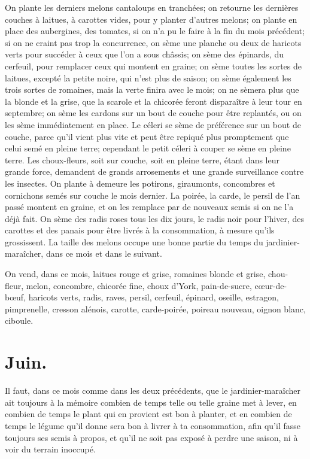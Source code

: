 \documentclass[10pt,a4paper]{book}
\begin{document}
On plante les derniers melons cantaloups en tranchées; on retourne les dernières couches à laitues, à carottes vides, pour y planter d'autres melons; on plante en place des aubergines, des tomates, si on n'a pu le faire à la fin du mois précédent; si on ne craint pas trop la concurrence, on sème une planche ou deux de haricots verts pour succéder à ceux que l'on a sous châssis; on sème des épinards, du cerfeuil, pour remplacer ceux qui montent en graine; on sème toutes les sortes de laitues, excepté la petite noire, qui n'est plus de saison; on sème également les trois sortes de romaines, mais la verte finira avec le mois; on ne sèmera plus que la blonde et la grise, que la scarole et la chicorée feront disparaître à leur tour en septembre; on sème les cardons sur un bout de couche pour être replantés, ou on les sème immédiatement en place. Le céleri se sème de préférence sur un bout de couche, parce qu'il vient plus vite et peut être repiqué plus promptement que celui semé en pleine terre; cependant le petit céleri à couper se sème en pleine terre. Les choux-fleurs, soit sur couche, soit en pleine terre, étant dans leur grande force, demandent de grands arrosements et une grande surveillance contre les insectes. On plante à demeure les potirons, giraumonts, concombres et cornichons semés sur couche le mois dernier. La poirée, la carde, le persil de l'an passé montent en graine, et on les remplace par de nouveaux semis si on ne l'a déjà fait. On sème des radis roses tous les dix jours, le radis noir pour l'hiver, des carottes et des panais pour être livrés à la consommation, à mesure qu'ils grossissent. La taille des melons occupe une bonne partie du temps du jardinier-maraîcher, dans ce mois et dans le suivant.

On vend, dans ce mois, laitues rouge et grise, romaines blonde et grise, chou-fleur, melon, concombre, chicorée fine, choux d'York, pain-de-sucre, cœur-de-bœuf, haricots verts, radis, raves, persil, cerfeuil, épinard, oseille, estragon, pimprenelle, cresson alénois, carotte, carde-poirée, poireau nouveau, oignon blanc, ciboule.

\section{Juin.}

Il faut, dans ce mois comme dans les deux précédents, que le jardinier-maraîcher ait toujours à la mémoire combien de temps telle ou telle graine met à lever, en combien de temps le plant qui en provient est bon à planter, et en combien de temps le légume qu'il donne sera bon à livrer à ta consommation, afin qu'il fasse toujours ses semis à propos, et qu'il ne soit pas exposé à perdre une saison, ni à voir du terrain inoccupé.
\end{document}
